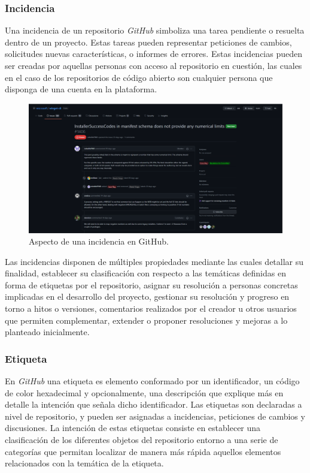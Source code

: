 \subsubsection{Incidencia} \label{sec:incidencia}

Una incidencia \cite{ct:github_issue} de un repositorio \emph{GitHub} simboliza una tarea pendiente o resuelta dentro de un proyecto. Estas tareas pueden representar peticiones de cambios, solicitudes nuevas características, o informes de errores. Estas incidencias pueden ser creadas por aquellas personas con acceso al repositorio en cuestión, las cuales en el caso de los repositorios de código abierto son cualquier persona que disponga de una cuenta en la plataforma.

\begin{figure}[!ht]
	\centering
	\includegraphics[width=\textwidth]{img/gh_repository_issue.png}
	\caption{Aspecto de una incidencia en GitHub.}
	\label{fig:gh_repository_issue}
\end{figure}

Las incidencias disponen de múltiples propiedades mediante las cuales detallar su finalidad, establecer su clasificación con respecto a las temáticas definidas en forma de etiquetas por el repositorio, asignar su resolución a personas concretas implicadas en el desarrollo del proyecto, gestionar su resolución y progreso en torno a hitos o versiones, comentarios realizados por el creador u otros usuarios que permiten complementar, extender o proponer resoluciones y mejoras a lo planteado inicialmente.

\subsubsection{Etiqueta} \label{sec:etiqueta}

En \emph{GitHub} una etiqueta \cite{ct:github_label} es elemento conformado por un identificador, un código de color hexadecimal y opcionalmente, una descripción que explique más en detalle la intención que señala dicho identificador. Las etiquetas son declaradas a nivel de repositorio, y pueden ser asignadas a incidencias, peticiones de cambios y discusiones. La intención de estas etiquetas consiste en establecer una clasificación de los diferentes objetos del repositorio entorno a una serie de categorías que permitan localizar de manera más rápida aquellos elementos relacionados con la temática de la etiqueta.

